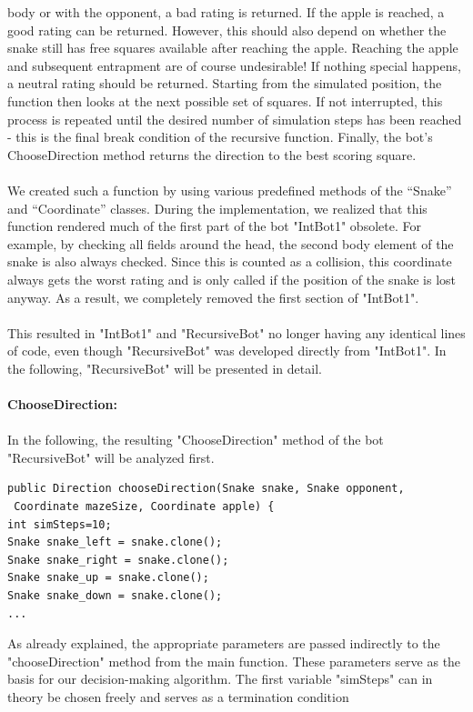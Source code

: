 \documentclass[a4paper,12pt]{article}
\begin{document}
body or with the opponent, a bad rating is returned. If the apple is reached, a good rating can be
returned. However, this should also depend on whether the snake still has free squares available
after reaching the apple. Reaching the apple and subsequent entrapment are of course undesirable!
If nothing special happens, a neutral rating should be returned. Starting from the simulated position,
the function then looks at the next possible set of squares. If not interrupted, this process is repeated
until the desired number of simulation steps has been reached - this is the final break condition of
the recursive function. Finally, the bot's ChooseDirection method returns the direction to the best
scoring square.\\
\\We created such a function by using various predefined methods of the “Snake” and “Coordinate”
classes. During the implementation, we realized that this function rendered much of the first part of
the bot "IntBot1" obsolete. For example, by checking all fields around the head, the second body
element of the snake is also always checked. Since this is counted as a collision, this coordinate
always gets the worst rating and is only called if the position of the snake is lost anyway. As a
result, we completely removed the first section of "IntBot1".\\
\\This resulted in "IntBot1" and "RecursiveBot" no longer having any identical lines of code, even
though "RecursiveBot" was developed directly from "IntBot1". In the following, "RecursiveBot"
will be presented in detail.\\
\\\textbf{ChooseDirection:}\\
\\In the following, the resulting "ChooseDirection" method of the bot "RecursiveBot" will be
analyzed first.
\begin{verbatim}
public Direction chooseDirection(Snake snake, Snake opponent,
 Coordinate mazeSize, Coordinate apple) {
int simSteps=10;
Snake snake_left = snake.clone();
Snake snake_right = snake.clone();
Snake snake_up = snake.clone();
Snake snake_down = snake.clone();
...
\end{verbatim}
As already explained, the appropriate parameters are passed indirectly to the "chooseDirection"
method from the main function. These parameters serve as the basis for our decision-making
algorithm.
The first variable "simSteps" can in theory be chosen freely and serves as a termination condition
\end{document}
